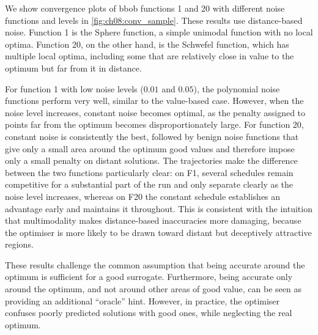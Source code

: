 We show convergence plots of \gls{bbob} functions 1 and 20 with different noise functions and levels in \cref{fig:ch08:conv_sample}. These results use distance-based noise. Function 1 is the Sphere function, a simple unimodal function with no local optima. Function 20, on the other hand, is the Schwefel function, which has multiple local optima, including some that are relatively close in value to the optimum but far from it in distance.

For function 1 with low noise levels ($0.01$ and $0.05$), the polynomial noise functions perform very well, similar to the value-based case. However, when the noise level increases, constant noise becomes optimal, as the penalty assigned to points far from the optimum becomes disproportionately large. For function 20, constant noise is consistently the best, followed by benign noise functions that give only a small area around the optimum good values and therefore impose only a small penalty on distant solutions.
The trajectories make the difference between the two functions particularly clear: on F1, several schedules remain competitive for a substantial part of the run and only separate clearly as the noise level increases, whereas on F20 the constant schedule establishes an advantage early and maintains it throughout. This is consistent with the intuition that multimodality makes distance-based inaccuracies more damaging, because the optimiser is more likely to be drawn toward distant but deceptively attractive regions.

These results challenge the common assumption that being accurate around the optimum is sufficient for a good surrogate. Furthermore, being accurate only around the optimum, and not around other areas of good value, can be seen as providing an additional ``oracle'' hint. However, in practice, the optimiser confuses poorly predicted solutions with good ones, while neglecting the real optimum.

